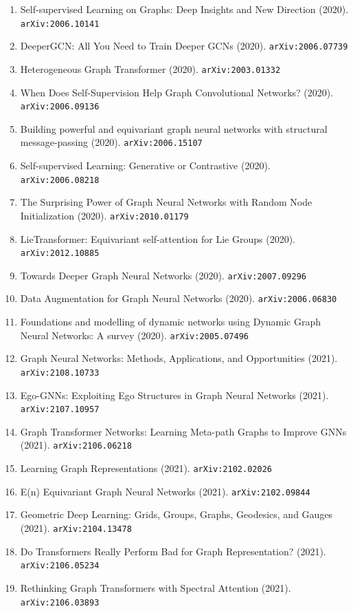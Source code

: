 \documentclass[11pt]{article}
\begin{document}
\begin{enumerate}
  \item Self-supervised Learning on Graphs: Deep Insights and New Direction (2020). \texttt{arXiv:2006.10141}
  \item DeeperGCN: All You Need to Train Deeper GCNs (2020). \texttt{arXiv:2006.07739}
  \item Heterogeneous Graph Transformer (2020). \texttt{arXiv:2003.01332}
  \item When Does Self-Supervision Help Graph Convolutional Networks? (2020). \texttt{arXiv:2006.09136}
  \item Building powerful and equivariant graph neural networks with structural
  message-passing (2020). \texttt{arXiv:2006.15107}
  \item Self-supervised Learning: Generative or Contrastive (2020). \texttt{arXiv:2006.08218}
  \item The Surprising Power of Graph Neural Networks with Random Node
  Initialization (2020). \texttt{arXiv:2010.01179}
  \item LieTransformer: Equivariant self-attention for Lie Groups (2020). \texttt{arXiv:2012.10885}
  \item Towards Deeper Graph Neural Networks (2020). \texttt{arXiv:2007.09296}
  \item Data Augmentation for Graph Neural Networks (2020). \texttt{arXiv:2006.06830}
  \item Foundations and modelling of dynamic networks using Dynamic Graph Neural
  Networks: A survey (2020). \texttt{arXiv:2005.07496}
  \item Graph Neural Networks: Methods, Applications, and Opportunities (2021). \texttt{arXiv:2108.10733}
  \item Ego-GNNs: Exploiting Ego Structures in Graph Neural Networks (2021). \texttt{arXiv:2107.10957}
  \item Graph Transformer Networks: Learning Meta-path Graphs to Improve GNNs (2021). \texttt{arXiv:2106.06218}
  \item Learning Graph Representations (2021). \texttt{arXiv:2102.02026}
  \item E(n) Equivariant Graph Neural Networks (2021). \texttt{arXiv:2102.09844}
  \item Geometric Deep Learning: Grids, Groups, Graphs, Geodesics, and Gauges (2021). \texttt{arXiv:2104.13478}
  \item Do Transformers Really Perform Bad for Graph Representation? (2021). \texttt{arXiv:2106.05234}
  \item Rethinking Graph Transformers with Spectral Attention (2021). \texttt{arXiv:2106.03893}

\end{enumerate}
\end{document}

